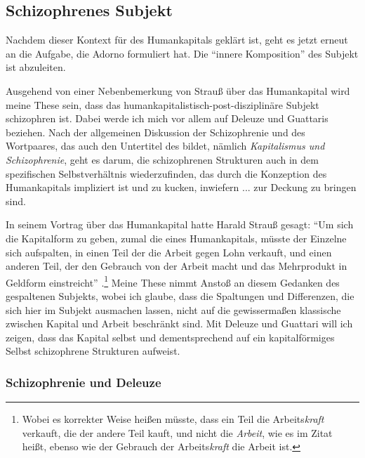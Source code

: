 \documentclass[12pt,
               DIV13,
               paper=a4,
               twoside=false,
               onehalfspacing,
               bibliography=totoc,
               toc=graduated,
               draft,
               ]{scrartcl}
\newcommand{\pc}[2]{\parencite[#1]{#2}}
\begin{document}


\subsection{Schizophrenes Subjekt}

Nachdem dieser Kontext für des Humankapitals geklärt ist, geht es
jetzt erneut an die Aufgabe, die Adorno formuliert hat. Die "`innere
Komposition"' \pc{261}{min} des Subjekt ist abzuleiten.

Ausgehend von einer Nebenbemerkung von Strauß über das Humankapital
wird meine These sein, dass das humankapitalistisch-post-disziplinäre
Subjekt schizophren ist. Dabei werde ich mich vor allem auf Deleuze
und Guattaris  beziehen. Nach der allgemeinen Diskussion
der Schizophrenie und des Wortpaares, das auch den Untertitel des
 bildet, nämlich \emph{Kapitalismus und Schizophrenie},
geht es darum, die schizophrenen Strukturen auch in dem spezifischen
Selbstverhältnis wiederzufinden, das durch die Konzeption des
Humankapitals impliziert ist und zu kucken, inwiefern ... zur Deckung
zu bringen sind.

In seinem Vortrag über das Humankapital hatte Harald Strauß gesagt:
"`Um sich die Kapitalform zu geben, zumal die eines Humankapitals,
müsste der Einzelne sich aufspalten, in einen Teil der die Arbeit
gegen Lohn verkauft, und einen anderen Teil, der den Gebrauch von der
Arbeit macht und das Mehrprodukt in Geldform einstreicht"' \pc{S.
126}{strauss}.\footnote{Wobei es korrekter Weise heißen müsste, dass
ein Teil die Arbeits\emph{kraft} verkauft, die der andere Teil kauft,
und nicht die \emph{Arbeit}, wie es im Zitat heißt, ebenso wie der
Gebrauch der Arbeits\emph{kraft} die Arbeit ist.} Meine These nimmt
Anstoß an diesem Gedanken des gespaltenen Subjekts, wobei ich glaube,
dass die Spaltungen und Differenzen, die sich hier im Subjekt
ausmachen lassen, nicht auf die gewissermaßen klassische zwischen
Kapital und Arbeit beschränkt sind. Mit Deleuze und Guattari will ich
zeigen, dass das Kapital selbst und dementsprechend auf ein
kapitalförmiges Selbst schizophrene Strukturen aufweist.

\subsubsection{Schizophrenie und Deleuze}
\end{document}
